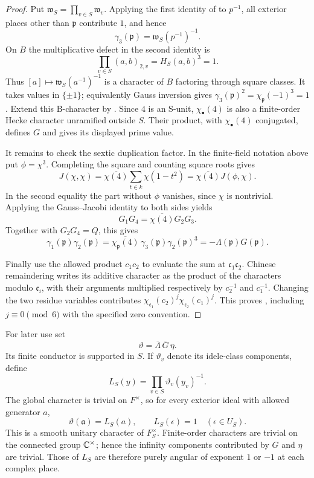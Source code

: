 \begin{proof}
Put \(\mathfrak w_S=\prod_{v\in S}\mathfrak w_v\).  Applying the first
identity of  to \(p^{-1}\), all exterior places other
than \(\mathfrak p\) contribute \(1\), and hence
\[
 \gamma_3(\mathfrak p)=\mathfrak w_S(p^{-1})^{-1}.
\]
On \(B\) the multiplicative defect in the second identity is
\[
 \prod_{v\in S}(a,b)_{2,v}=H_S(a,b)^3=1.
\]
Thus \([a]\mapsto\mathfrak w_S(a^{-1})^{-1}\) is a character of \(B\)
factoring through square classes.  It takes values in \(\{\pm1\}\);
equivalently Gauss inversion gives
\(\gamma_3(\mathfrak p)^2=\chi_{\mathfrak p}(-1)^3=1\).
Extend this B-character by .  Since \(4\) is an
S-unit, \(\chi_\bullet(4)\) is also a finite-order Hecke character unramified
outside \(S\).  Their product, with \(\chi_\bullet(4)\) conjugated, defines
\(G\) and gives its displayed prime value.

It remains to check the sextic duplication factor.  In the finite-field
notation above put \(\phi=\chi^3\).  Completing the square and counting
square roots gives
\[
 J(\chi,\chi)
  =\overline{\chi(4)}\sum_{t\in k}\chi(1-t^2)
  =\overline{\chi(4)}J(\phi,\chi).
\]
In the second equality the part without \(\phi\) vanishes, since \(\chi\)
is nontrivial.  Applying the Gauss--Jacobi identity to both sides yields
\[
 G_1G_4=\overline{\chi(4)}G_2G_3.
\]
Together with \(G_2G_4=Q\), this gives
\[
 \gamma_1(\mathfrak p)\gamma_2(\mathfrak p)
   =\overline{\chi_{\mathfrak p}(4)}\,
      \gamma_3(\mathfrak p)\gamma_2(\mathfrak p)^3
   =-\Lambda(\mathfrak p)G(\mathfrak p).
\]

Finally use the allowed product \(c_1c_2\) to evaluate the sum at
\(\mathfrak c_1\mathfrak c_2\).  Chinese remaindering writes its additive
character as the product of the characters modulo \(\mathfrak c_i\), with
their arguments multiplied respectively by \(c_2^{-1}\) and \(c_1^{-1}\).
Changing the two residue variables contributes
\(\chi_{\mathfrak c_1}(c_2)^j\chi_{\mathfrak c_2}(c_1)^j\).
This proves , including \(j\equiv0\pmod6\) with the
specified zero convention.
\end{proof}

For later use set
\[
 \vartheta=\overline\Lambda\,\overline G\,\eta.
\]
Its finite conductor is supported in \(S\).  If \(\vartheta_v\) denote its
idele-class components, define
\[
 L_S(y)=\prod_{v\in S}\vartheta_v(y_v)^{-1}.
\]
The global character is trivial on \(F^\times\), so for every exterior
ideal with allowed generator \(a\),
\begin{equation}
 \vartheta(\mathfrak a)=L_S(a),\qquad L_S(\epsilon)=1
       \quad(\epsilon\in U_S).\label{eq:vartheta-s}
\end{equation}
This is a smooth unitary character of \(F_S^\times\).  Finite-order
characters are trivial on the connected group \(\mathbb{C}^\times\); hence the
infinity components contributed by \(G\) and \(\eta\) are trivial.
Those of \(L_S\) are therefore purely angular of exponent \(1\) or \(-1\)
at each complex place.
